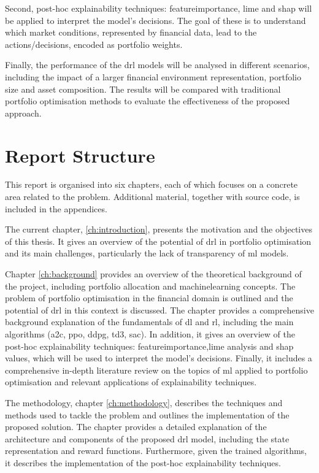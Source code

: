 Second, post-hoc explainability techniques: \Gls{featureimportance}, \acrfull{lime} and \acrfull{shap} will be applied to interpret the model's decisions. The goal of these is to understand which market conditions, represented by financial data, lead to the actions/decisions, encoded as portfolio weights. 

Finally, the performance of the \acrshort{drl} models will be analysed in different scenarios, including the impact of a larger financial environment representation, portfolio size and asset composition. The results will be compared with traditional portfolio optimisation methods to evaluate the effectiveness of the proposed approach.

\section{Report Structure} \label{sec:introduction-structure}

This report is organised into six chapters, each of which focuses on a concrete area related to the problem. Additional material, together with source code, is included in the appendices. 

The current chapter, \ref{ch:introduction}, presents the motivation and the objectives of this thesis. It gives an overview of the potential of \acrshort{drl} in portfolio optimisation and its main challenges, particularly the lack of transparency of \acrshort{ml} models. 

Chapter \ref{ch:background} provides an overview of the theoretical background of the project, including portfolio allocation and \acrlong{machinelearning} concepts. The problem of portfolio optimisation in the financial domain is outlined and the potential of \acrshort{drl} in this context is discussed. The chapter provides a comprehensive background explanation of the fundamentals of \acrlong{dl} and \acrlong{rl}, including the main algorithms (\acrshort{a2c}, \acrshort{ppo}, \acrshort{ddpg}, \acrshort{td3}, \acrshort{sac}). In addition, it gives an overview of the post-hoc explainability techniques: \Gls{featureimportance},\acrfull{lime} analysis and \acrfull{shap} values, which will be used to interpret the model's decisions. Finally, it includes a comprehensive in-depth literature review on the topics of \acrshort{ml} applied to portfolio optimisation and relevant applications of explainability techniques. 

The methodology, chapter \ref{ch:methodology}, describes the techniques and methods used to tackle the problem and outlines the implementation of the proposed solution. The chapter provides a detailed explanation of the architecture and components of the proposed \acrshort{drl} model, including the state representation and reward functions. Furthermore, given the trained algorithms, it describes the implementation of the post-hoc explainability techniques.

